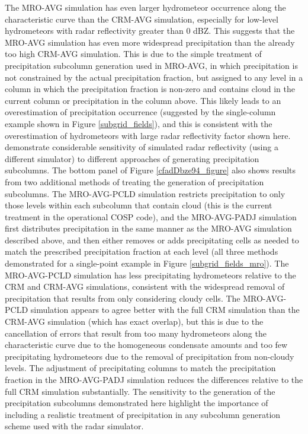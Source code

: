 \documentclass[letter]{article}
\begin{document}
The MRO-AVG simulation has even larger hydrometeor occurrence along the characteristic curve than the CRM-AVG simulation, especially for low-level hydrometeors with radar reflectivity greater than 0 dBZ. This suggests that the MRO-AVG simulation has even more widespread precipitation than the already too high CRM-AVG simulation. This is due to the simple treatment of precipitation subcolumn generation used in MRO-AVG, in which precipitation is not constrained by the actual precipitation fraction, but assigned to any level in a column in which the precipitation fraction is non-zero and contains cloud in the current column or precipitation in the column above. This likely leads to an overestimation of precipitation occurrence (suggested by the single-column example shown in Figure \ref{subgrid_fields}), and this is consistent with the overestimation of hydrometeors with large radar reflectivity factor shown here. \cite{dimichele_et_al_2012} demonstrate considerable sensitivity of simulated radar reflectivity (using a different simulator) to different approaches of generating precipitation subcolumns. The bottom panel of Figure \ref{cfadDbze94_figure} also shows results from two additional methods of treating the generation of precipitation subcolumns. The MRO-AVG-PCLD simulation restricts precipitation to only those levels within each subcolumn that contain cloud (this is the current treatment in the operational COSP code), and the MRO-AVG-PADJ simulation first distributes precipitation in the same manner as the MRO-AVG simulation described above, and then either removes or adds precipitating cells as needed to match the prescribed precipitation fraction at each level (all three methods demonstrated for a single-point example in Figure \ref{subgrid_fields_mro}). The MRO-AVG-PCLD simulation has less precipitating hydrometeors relative to the CRM and CRM-AVG simulations, consistent with the widespread removal of precipitation that results from only considering cloudy cells. The MRO-AVG-PCLD simulation appears to agree better with the full CRM simulation than the CRM-AVG simulation (which has exact overlap), but this is due to the cancellation of errors that result from too many hydrometeors along the characteristic curve due to the homogeneous condensate amounts and too few precipitating hydrometeors due to the removal of precipitation from non-cloudy levels. The adjustment of precipitating columns to match the precipitation fraction in the MRO-AVG-PADJ simulation reduces the differences relative to the full CRM simulation substantially. The sensitivity to the generation of the precipitation subcolumns demonstrated here highlight the importance of including a realistic treatment of precipitation in any subcolumn generation scheme used with the radar simulator.
\end{document}
